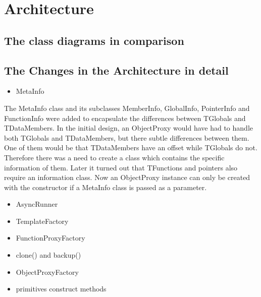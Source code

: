 \chapter{Architecture}
\section{The class diagrams in comparison}
	
\section{The Changes in the Architecture in detail}
\begin{itemize}
	\item MetaInfo
\end{itemize}
The MetaInfo class and its subclasses MemberInfo, GlobalInfo, PointerInfo and FunctionInfo were added to encapsulate the 
differences between TGlobals and TDataMembers. In the initial design, an ObjectProxy would have had to handle
both TGlobals and TDataMembers, but there subtle differences between them. One of them would be that TDataMembers 
have an offset while TGlobals do not. Therefore there was a need to create a class which contains the specific information 
of them. Later it turned out that TFunctions and pointers also require an information class. 
Now an ObjectProxy instance can only be created with the constructor if a MetaInfo class is passed as a parameter.
\begin{itemize}
	\item AsyncRunner
\end{itemize}

\begin{itemize}
	\item TemplateFactory
\end{itemize}
\begin{itemize}
	\item FunctionProxyFactory
\end{itemize}
\begin{itemize}
	\item clone() and backup()
\end{itemize}
\begin{itemize}
	\item ObjectProxyFactory
\end{itemize}
\begin{itemize}
	\item primitives construct methods
\end{itemize}



